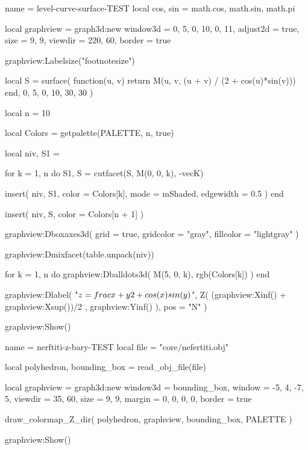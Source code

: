 \documentclass{scrartcl}
\begin{document}
\bigskip


\begin{luadraw}{name = level-curve-surface-TEST}
local cos, sin = math.cos, math.sin, math.pi

local graphview = graph3d:new{
  window3d = {0, 5, 0, 10, 0, 11},
  adjust2d = true,
  size     = {9, 9},
  viewdir  = {220, 60},
  border   = true
}

graphview:Labelsize("footnotesize")

local S = surface(
  function(u, v)
    return M(u, v, (u + v) / (2 + cos(u)*sin(v)))
  end,
  0, 5, 0, 10,
  {30, 30}
)

local n = 10

local Colors = getpalette(PALETTE, n, true)

local niv, S1 = {}

for k = 1, n do
  S1, S = cutfacet(S, {M(0, 0, k), -vecK})

  insert(
    niv,
    {
      S1,
      {
        color     = Colors[k],
        mode      = mShaded,
        edgewidth = 0.5
      }
    }
  )
end

insert(
  niv,
  {
    S,
    {color = Colors[n + 1]}
  }
)

graphview:Dboxaxes3d({
  grid      = true,
  gridcolor = "gray",
  fillcolor = "lightgray"
})

graphview:Dmixfacet(table.unpack(niv))

for k = 1, n do
  graphview:Dballdots3d(
    M(5, 0, k),
    rgb(Colors[k])
  )
end

graphview:Dlabel(
  "$z = \\frac{x + y}{2 + \\cos(x) \\sin(y)}$",
  Z(
    (graphview:Xinf() + graphview:Xsup())/2 ,
    graphview:Yinf()
  ),
  {pos = "N"}
)

graphview:Show()
\end{luadraw}


\bigskip


\begin{luadraw}{name = nerftiti-z-bary-TEST}
local file = "core/nefertiti.obj"

local polyhedron, bounding_box = read_obj_file(file)

local graphview = graph3d:new{
  window3d = bounding_box,
  window   = {-5, 4, -7, 5},
  viewdir  = {35, 60},
  size     = {9, 9},
  margin   = {0, 0, 0, 0},
  border   = true
}

draw_colormap_Z_dir(
  polyhedron,
  graphview,
  bounding_box,
  PALETTE
)

graphview:Show()
\end{luadraw}
\end{document}
